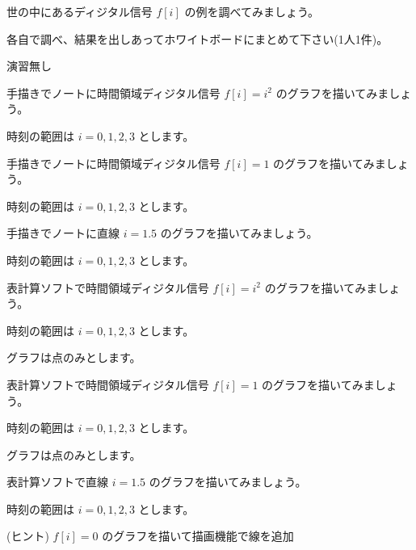 \documentclass[a4paper]{jarticle}
\begin{document}


 世の中にあるディジタル信号 $f[i]$ の例を調べてみましょう。\par
\noindent 各自で調べ、結果を出しあってホワイトボードにまとめて下さい(1人1件)。


\vspace{2zh}
\noindent 演習無し


 手描きでノートに時間領域ディジタル信号 $f[i] = i^2$ のグラフを描いてみましょう。\par
\noindent 時刻の範囲は $i = 0,1,2,3$ とします。

 手描きでノートに時間領域ディジタル信号 $f[i] = 1$ のグラフを描いてみましょう。\par
\noindent 時刻の範囲は $i = 0,1,2,3$ とします。

 手描きでノートに直線 $i = 1.5$ のグラフを描いてみましょう。\par
\noindent 時刻の範囲は $i = 0,1,2,3$ とします。

 表計算ソフトで時間領域ディジタル信号 $f[i] = i^2$ のグラフを描いてみましょう。\par
\noindent 時刻の範囲は $i = 0,1,2,3$ とします。\par
\noindent グラフは点のみとします。

 表計算ソフトで時間領域ディジタル信号 $f[i] = 1$ のグラフを描いてみましょう。\par
\noindent 時刻の範囲は $i = 0,1,2,3$ とします。\par
\noindent グラフは点のみとします。

 表計算ソフトで直線 $i = 1.5$ のグラフを描いてみましょう。\par
\noindent 時刻の範囲は $i = 0,1,2,3$ とします。\par
\noindent (ヒント) $f[i] = 0$ のグラフを描いて描画機能で線を追加

\savepractime
\end{document}
